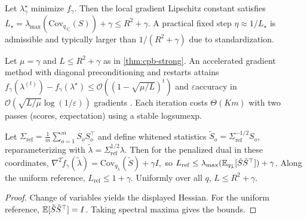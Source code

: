 \begin{corollary}\label{cor:local-L}
Let $\lambda^\star_\gamma$ minimize $f_\gamma$. Then the local gradient Lipschitz constant satisfies $L_\star=\lambda_{\max}(\mathrm{Cov}_{q_{\lambda^\star_\gamma}}(S))+\gamma\le R^2+\gamma$. A practical fixed step $\eta\approx 1/L_\star$ is admissible and typically larger than $1/(R^2+\gamma)$ due to standardization.
\end{corollary}

\begin{proposition}\label{prop:accel}
Let $\mu=\gamma$ and $L\le R^2+\gamma$ as in \cref{thm:cpb-strong}. An accelerated gradient method with diagonal preconditioning and restarts attains $f_\gamma(\lambda^{(t)})-f_\gamma(\lambda^\star)\le \mathcal{O}\!\left((1-\sqrt{\mu/L})^{t}\right)$ and $\varepsilon$\textendash accuracy in $\mathcal{O}\!\left(\sqrt{L/\mu}\log(1/\varepsilon)\right)$ gradients \cite{nesterov2004introductory,odonoghue2015restart}. Each iteration costs $\Theta(Km)$ with two passes (scores, expectation) using a stable log\textendash sum\textendash exp.
\end{proposition}

\begin{lemma}\label{lem:refwhiten}
Let $\Sigma_{\mathrm{ref}}=\frac{1}{m}\sum_{o=1}^m S_o S_o^\top$ and define whitened statistics $\tilde S_o=\Sigma_{\mathrm{ref}}^{-1/2}S_o$, reparameterizing with $\tilde\lambda=\Sigma_{\mathrm{ref}}^{1/2}\lambda$. Then for the penalized dual in these coordinates,
$
\nabla^2 \tilde f_\gamma(\tilde\lambda)=\mathrm{Cov}_{q_{\tilde\lambda}}(\tilde S)+\gamma I,
$
so $L_{\mathrm{ref}}\le \lambda_{\max}(\mathbb{E}_{q_{\tilde\lambda}}[\tilde S\tilde S^\top])+\gamma$. Along the uniform reference, $L_{\mathrm{ref}}\le 1+\gamma$. Uniformly over all $q$, $L\le R^2+\gamma$.
\end{lemma}
\begin{proof}
Change of variables yields the displayed Hessian. For the uniform reference, $\mathbb{E}[\tilde S\tilde S^\top]=I$. Taking spectral maxima gives the bounds.
\end{proof}

